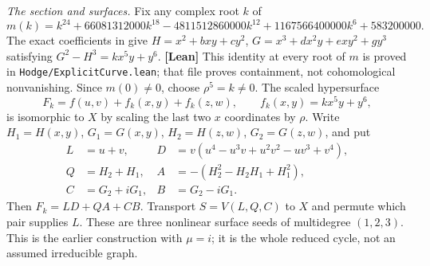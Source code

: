 \documentclass[11pt]{amsart}
\theoremstyle{remark}\newtheorem{remark}[theorem]{Remark}
\begin{document}
\emph{The section and surfaces.} Fix any complex root $k$ of
\[
 m(k)=k^{24}+66081312000k^{18}-4811512860000k^{12}
       +1167566400000k^6+583200000.
\]
The exact coefficients in  give
$H=x^2+bxy+cy^2$, $G=x^3+dx^2y+exy^2+gy^3$ satisfying
$G^2-H^3=kx^5y+y^6$. \textbf{[Lean]} This identity at every root of $m$
is proved in \texttt{Hodge/ExplicitCurve.lean}; that file proves containment,
not cohomological nonvanishing. Since $m(0)\ne0$, choose $\rho^5=k\ne0$.
The scaled hypersurface
\[
 F_k=f(u,v)+f_k(x,y)+f_k(z,w),\qquad f_k(x,y)=kx^5y+y^6,
\]
is isomorphic to $X$ by scaling the last two $x$ coordinates by $\rho$.
Write $H_1=H(x,y)$, $G_1=G(x,y)$, $H_2=H(z,w)$, $G_2=G(z,w)$, and put
\begin{align*}
 L&=u+v,& D&=v(u^4-u^3v+u^2v^2-uv^3+v^4),\\
 Q&=H_2+H_1,& A&=-(H_2^2-H_2H_1+H_1^2),\\
 C&=G_2+iG_1,& B&=G_2-iG_1.
\end{align*}
Then $F_k=LD+QA+CB$. Transport $S=V(L,Q,C)$ to $X$ and permute
which pair supplies $L$. These are three nonlinear surface seeds of
multidegree $(1,2,3)$. This is the earlier construction with $\mu=i$;
it is the whole reduced cycle, not an assumed irreducible graph.
\end{document}
